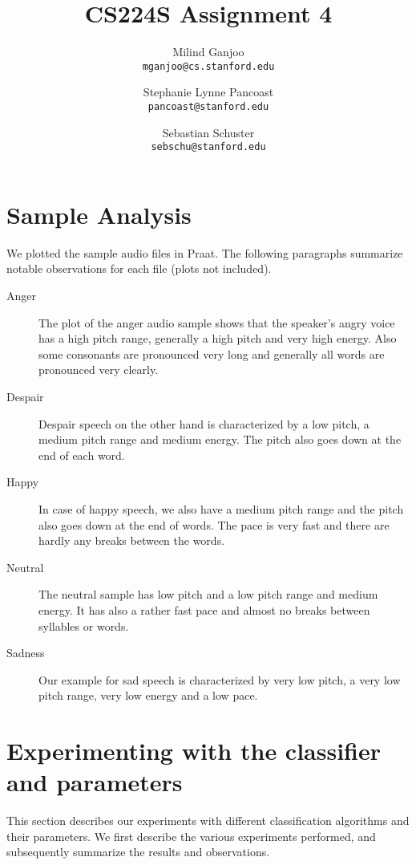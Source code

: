 \documentclass[twocolumn, 11pt]{article}
\title{CS224S Assignment 4}
\author{Milind Ganjoo\\\texttt{mganjoo@cs.stanford.edu}
\and%
Stephanie Lynne Pancoast\\\texttt{pancoast@stanford.edu}
\and%
Sebastian Schuster\\\texttt{sebschu@stanford.edu}}
\date{}
\begin{document}
\maketitle
{}

\section{Sample Analysis}

We plotted the sample audio files in Praat. The following paragraphs summarize
notable observations for each file (plots not included).

\begin{description}

  \item[Anger] The plot of the anger audio sample shows that the speaker's
  angry voice has a high pitch range, generally a high pitch and very high
  energy. Also some consonants are pronounced very long and generally all words
  are pronounced very clearly.

  \item[Despair] Despair speech on the other hand is characterized by a low
  pitch, a medium pitch range and medium energy. The pitch also goes down at
  the end of each word.

  \item[Happy] In case of happy speech, we also have a medium pitch range and
  the pitch also goes down at the end of words. The pace is very fast and there
  are hardly any breaks between the words.

  \item[Neutral] The neutral sample has low pitch and a low pitch range and
  medium energy. It has also a rather fast pace and almost no breaks between
  syllables or words.

  \item[Sadness] Our example for sad speech is characterized by very low pitch,
  a very low pitch range, very low energy and a low pace.

\end{description}

\section{Experimenting with the classifier and parameters}

This section describes our experiments with different classification algorithms
and their parameters. We first describe the various experiments performed, and
subsequently summarize the results and observations.
\end{document}
